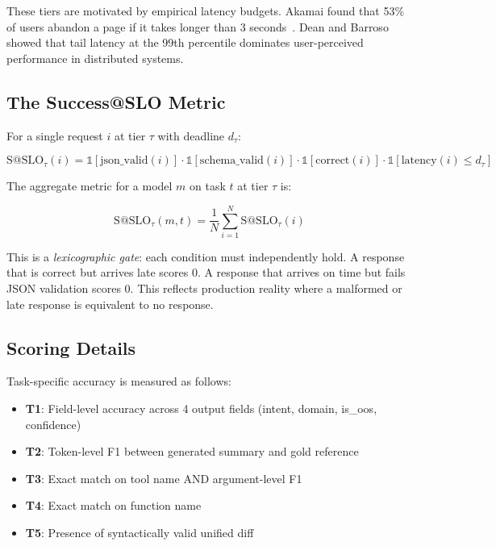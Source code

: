 \documentclass[11pt]{article}
\makeatletter
\newcommand{\sslo}{\ensuremath{\mathrm{S@SLO}}}
\makeatother
\begin{document}
These tiers are motivated by empirical latency budgets.  Akamai found that 53\% of users abandon a page if it takes longer than 3 seconds~\cite{akamai2017performance}.  Dean and Barroso~\cite{dean2013tail} showed that tail latency at the 99th percentile dominates user-perceived performance in distributed systems.

\subsection{The Success@SLO Metric}

For a single request $i$ at tier $\tau$ with deadline $d_\tau$:

\begin{equation}
\sslo_\tau(i) = \mathbb{1}[\text{json\_valid}(i)] \cdot \mathbb{1}[\text{schema\_valid}(i)] \cdot \mathbb{1}[\text{correct}(i)] \cdot \mathbb{1}[\text{latency}(i) \leq d_\tau]
\end{equation}

The aggregate metric for a model $m$ on task $t$ at tier $\tau$ is:

\begin{equation}
\sslo_\tau(m, t) = \frac{1}{N} \sum_{i=1}^{N} \sslo_\tau(i)
\end{equation}

This is a \emph{lexicographic gate}: each condition must independently hold.  A response that is correct but arrives late scores 0.  A response that arrives on time but fails JSON validation scores 0.  This reflects production reality where a malformed or late response is equivalent to no response.

\subsection{Scoring Details}

Task-specific accuracy is measured as follows:
\begin{itemize}[leftmargin=*]
\item \textbf{T1}: Field-level accuracy across 4 output fields (intent, domain, is\_oos, confidence)
\item \textbf{T2}: Token-level F1 between generated summary and gold reference
\item \textbf{T3}: Exact match on tool name AND argument-level F1
\item \textbf{T4}: Exact match on function name
\item \textbf{T5}: Presence of syntactically valid unified diff
\end{itemize}
\end{document}
